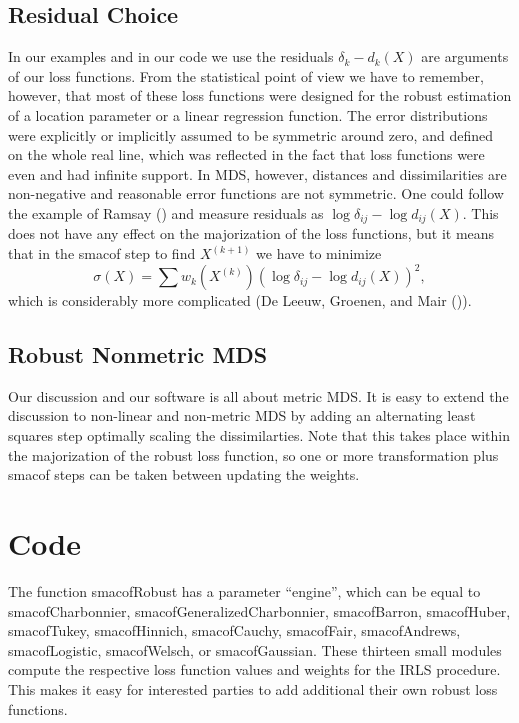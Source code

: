 \documentclass[
  12pt,
  letterpaper,
  DIV=11,
  numbers=noendperiod]{scrartcl}
\newcommand{\sectionbreak}{\pagebreak}
\theoremstyle{plain}
\theoremstyle{plain}
\theoremstyle{plain}
\theoremstyle{definition}
\theoremstyle{remark}
\begin{document}
\subsection{Residual Choice}\label{residual-choice}

In our examples and in our code we use the residuals \(\delta_k-d_k(X)\)
are arguments of our loss functions. From the statistical point of view
we have to remember, however, that most of these loss functions were
designed for the robust estimation of a location parameter or a linear
regression function. The error distributions were explicitly or
implicitly assumed to be symmetric around zero, and defined on the whole
real line, which was reflected in the fact that loss functions were even
and had infinite support. In MDS, however, distances and dissimilarities
are non-negative and reasonable error functions are not symmetric. One
could follow the example of Ramsay () and
measure residuals as \(\log\delta_{ij}-\log d_{ij}(X)\). This does not
have any effect on the majorization of the loss functions, but it means
that in the smacof step to find \(X^{(k+1)}\) we have to minimize \[
\sigma(X)=\sum w_k(X^{(k)})(\log\delta_{ij}-\log d_{ij}(X))^2,
\] which is considerably more complicated (De Leeuw, Groenen, and Mair
()).

\subsection{Robust Nonmetric MDS}\label{robust-nonmetric-mds}

Our discussion and our software is all about metric MDS. It is easy to
extend the discussion to non-linear and non-metric MDS by adding an
alternating least squares step optimally scaling the dissimilarties.
Note that this takes place within the majorization of the robust loss
function, so one or more transformation plus smacof steps can be taken
between updating the weights.

\sectionbreak

\section{Code}\label{code}

The function smacofRobust has a parameter ``engine'', which can be equal
to smacofCharbonnier, smacofGeneralizedCharbonnier, smacofBarron,
smacofHuber, smacofTukey, smacofHinnich, smacofCauchy, smacofFair,
smacofAndrews, smacofLogistic, smacofWelsch, or smacofGaussian. These
thirteen small modules compute the respective loss function values and
weights for the IRLS procedure. This makes it easy for interested
parties to add additional their own robust loss functions.
\end{document}
